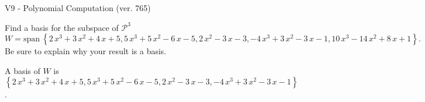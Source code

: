 \begin{exercise}
  \begin{exerciseTitle}V9 - Polynomial Computation (ver. 765)\end{exerciseTitle}
  \begin{exerciseStatement}
    Find a basis for the subspace of \(\mathcal{P}^3\) 
\[W=\mathrm{span}\ \left\{2 \, x^{3} + 3 \, x^{2} + 4 \, x + 5 , 5 \, x^{3} + 5 \, x^{2} - 6 \, x - 5 , 2 \, x^{2} - 3 \, x - 3 , -4 \, x^{3} + 3 \, x^{2} - 3 \, x - 1 , 10 \, x^{3} - 14 \, x^{2} + 8 \, x + 1\right\}.\]
 Be sure to explain why your result is a basis.


  \end{exerciseStatement}
  \begin{exerciseAnswer}
   A basis of \(W\) is  \(\left\{2 \, x^{3} + 3 \, x^{2} + 4 \, x + 5 , 5 \, x^{3} + 5 \, x^{2} - 6 \, x - 5 , 2 \, x^{2} - 3 \, x - 3 , -4 \, x^{3} + 3 \, x^{2} - 3 \, x - 1\right\}\).
  


  \end{exerciseAnswer}
\end{exercise}
